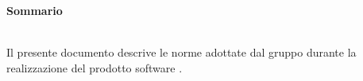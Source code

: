 \begin{Large}\textbf{Sommario}\end{Large}\\

Il presente documento descrive le norme adottate dal gruppo \gruppo{} durante la realizzazione del prodotto software \progetto{}.\\